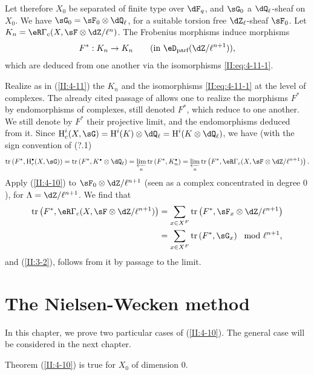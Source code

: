 Let therefore $X_0$ be separated of finite type over $\dF_q$, and $\sG_0$ a
$\dQ_\ell$-sheaf on $X_0$. We have $\sG_0=\sF_0\otimes\dQ_\ell$, for
a suitable torsion free $\dZ_\ell$-sheaf $\sF_0$. Let
$K_n=\eR\Gamma_c(X,\sF\otimes\dZ/\ell^n)$. The Frobenius morphisms induce
morphisms
\[
  F^* : K_n\to K_n \qquad \text{(in $\eD_\text{parf}(\dZ/\ell^{n+1})$),}
\]
which are deduced from one another via the isomorphisms
\eqref{II:eq:4-11-1}.

Realize as in (\ref{II:4-11}) the $K_n$ and the isomorphisms
\eqref{II:eq:4-11-1} at the level of complexes. The already cited passage of
\cite[XV.3.3]{sga5} allows one to realize the morphisms $F^*$ by
endomorphisms of complexes, still denoted $F^*$, which reduce to one
another. We still denote by $F^*$ their projective limit, and the
endomorphisms deduced from it. Since
$\h_c^i(X,\sG) = \h^i(K)\otimes\dQ_\ell = \h^i(K\otimes\dQ_\ell)$, we have (with
the sign convention of (?.1)
\[
  \tr\left(F^*, \h_c^\bullet(X,\sG)\right) = \tr\left(F^*,K^\bullet\otimes\dQ_\ell\right) = \varprojlim_n \tr\left(F^*,K_n^\bullet\right) = \varprojlim_n \tr\left(F^*,\eR\Gamma_c(X,\sF\otimes\dZ/\ell^{n+1})\right) \text{.}
\]
Apply (\ref{II:4-10}) to $\sF_0\otimes\dZ/\ell^{n+1}$ (seen as a complex
concentrated in degree $0$), for $\Lambda=\dZ/\ell^{n+1}$. We find that
\begin{align*}
  \tr\left(F^*,\eR\Gamma_c(X,\sF\otimes\dZ/\ell^{n+1})\right)
    &= \sum_{x\in X^F} \tr\left(F^*,\sF_x\otimes\dZ/\ell^{n+1}\right) \\
    &= \sum_{x\in X^F} \tr\left(F^*,\sG_x\right) \mod \ell^{n+1} \text{,}
\end{align*}
and (\ref{II:3-2}), follows from it by passage to the limit.










\section{The Nielsen-Wecken method}\label{II:5}

In this chapter, we prove two particular cases of (\ref{II:4-10}). The
general case will be considered in the next chapter.




\begin{lemma_}\label{II:5-1}
Theorem (\ref{II:4-10}) is true for $X_0$ of dimension $0$.
\end{lemma_}

